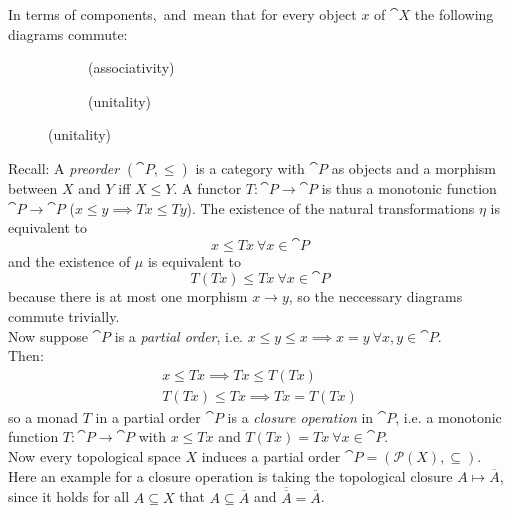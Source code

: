 \begin{definition}[monad]
In terms of components,~ and~ mean that for every object $x$ of $\cat{X}$
the following diagrams commute:

\begin{figure}[H]
\centering
\begin{subfigure}{0.4\textwidth}
\centering
\caption*{(associativity)}
\end{subfigure}
\hspace{2em}
\begin{subfigure}{0.4\textwidth}
\centering
\caption*{(unitality)}
\end{subfigure}
\end{figure}

\end{definition}

\begin{example}[preorder]
Recall: A \textit{preorder} $(\cat{P},\le)$ is a category with $\cat{P}$ as objects and 
a morphism between $X$ and $Y$ iff $X \le Y$.
A functor $T\colon \cat{P} \to \cat{P}$ is thus a monotonic function $\cat{P}\to \cat{P}$
($x \le y \implies Tx\le Ty$).
The existence of the natural transformations $\eta$ is equivalent to
\[x \le Tx \ \forall x \in \cat{P}\]
and the existence of $\mu$ is equivalent to
\[T(Tx) \le Tx \ \forall x \in \cat{P}\] 
because there is at most one morphism $x \to y$, so the neccessary diagrams commute trivially.\\
Now suppose $\cat{P}$ is a \textit{partial order}, i.e. $x \le y \le x \implies x = y \ \forall x,y \in \cat{P}$. \\
Then:
\begin{align*}
    x \le Tx \implies Tx \le T(Tx) \\
    T(Tx) \le Tx \implies Tx = T(Tx)
\end{align*}
so a monad $T$ in a partial order $\cat{P}$ is a \textit{closure operation} in $\cat{P}$, i.e. 
a monotonic function $T \colon \cat{P} \to \cat{P}$ 
with $x \le Tx$ and $T(Tx)=Tx \ \forall x \in \cat{P}.$ \\
Now every topological space $X$ induces a partial order $\cat{P} = (\mathscr{P}(X),\subseteq)$.
Here an example for a closure operation is taking the topological closure $A \mapsto \overline{A}$,
since it holds for all $A \subseteq X$ that $A \subseteq \overline{A}$ and
$\overline{\overline{A}} = \overline{A}$.
\end{example}

